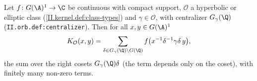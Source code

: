 Let $f\colon G(\A)^1\to\C$ be continuous with compact support, $\mathcal O$ a hyperbolic or elliptic class (\cref{II.kernel.def:class-types}) and
$\gamma\in\mathcal O$, with centralizer $G_\gamma(\Q)$ (\texttt{II.orb.def:centralizer}). Then for all $x,y\in G(\A)^1$
\[
  K_{\mathcal O}(x,y)=\sum_{\delta\in G_\gamma(\Q)\backslash G(\Q)}f\bigl(x^{-1}\delta^{-1}\gamma\delta\,y\bigr),
\]
the sum over the right cosets $G_\gamma(\Q)\delta$ (the term depends only on the coset), with finitely many non-zero terms.

